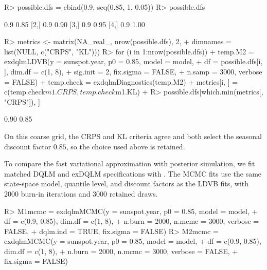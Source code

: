 \documentclass{jss}
\begin{document}
\begin{CodeChunk}
\begin{CodeInput}
R> possible.dfs = cbind(0.9, seq(0.85, 1, 0.05))
R> possible.dfs
\end{CodeInput}
\begin{CodeOutput}
     [,1] [,2]
[1,]  0.9 0.85
[2,]  0.9 0.90
[3,]  0.9 0.95
[4,]  0.9 1.00
\end{CodeOutput}
\begin{CodeInput}
R> metrics <- matrix(NA_real_, nrow(possible.dfs), 2,
+                    dimnames = list(NULL, c("CRPS", "KL")))
R> for (i in 1:nrow(possible.dfs)) {
+   temp.M2 = exdqlmLDVB(y = sunspot.year, p0 = 0.85, model = model,
+                  df = possible.dfs[i, ], dim.df = c(1, 8),
+                  sig.init = 2, fix.sigma = FALSE,
+                  n.samp = 3000, verbose = FALSE)
+   temp.check = exdqlmDiagnostics(temp.M2)
+   metrics[i, ] = c(temp.check$m1.CRPS, temp.check$m1.KL)
+ }
R> possible.dfs[which.min(metrics[, "CRPS"]), ]
\end{CodeInput}
\begin{CodeOutput}
[1] 0.90 0.85
\end{CodeOutput}
\end{CodeChunk}
On this coarse grid, the CRPS and KL criteria agree and both select the seasonal discount factor \(0.85\), so the choice used above is retained.

To compare the fast variational approximation with posterior simulation, we fit matched DQLM and exDQLM specifications with . The MCMC fits use the same state-space model, quantile level, and discount factors as the LDVB fits, with 2000 burn-in iterations and 3000 retained draws.

\begin{CodeChunk}
\begin{CodeInput}
R> M1mcmc = exdqlmMCMC(y = sunspot.year, p0 = 0.85, model = model,
+                df = c(0.9, 0.85), dim.df = c(1, 8),
+                n.burn = 2000, n.mcmc = 3000, verbose = FALSE,
+                dqlm.ind = TRUE, fix.sigma = FALSE)
R> M2mcmc = exdqlmMCMC(y = sunspot.year, p0 = 0.85, model = model,
+                df = c(0.9, 0.85), dim.df = c(1, 8),
+                n.burn = 2000, n.mcmc = 3000, verbose = FALSE,
+                fix.sigma = FALSE)
\end{CodeInput}
\end{CodeChunk}
\end{document}
